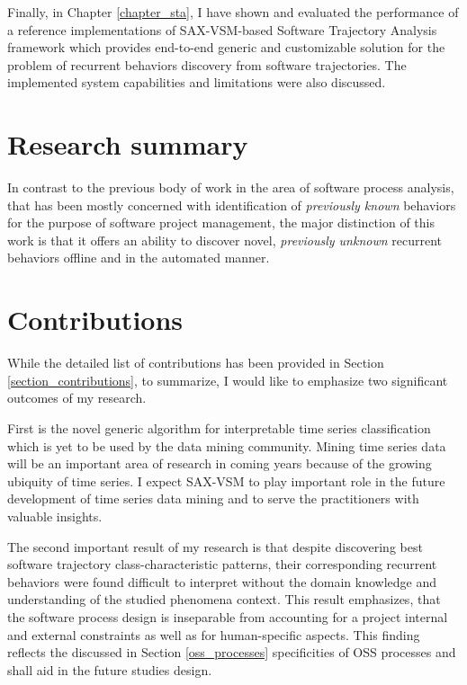 Finally, in Chapter \ref{chapter_sta}, I have shown and evaluated the performance of a reference implementations of SAX-VSM-based Software Trajectory Analysis framework which provides end-to-end generic and customizable solution for the problem of recurrent behaviors discovery from software trajectories. The implemented system capabilities and limitations were also discussed.

\section{Research summary}
In contrast to the previous body of work in the area of software process analysis, that has been mostly concerned with identification of \textit{previously known} behaviors for the purpose of software project management, the major distinction of this work is that it offers an ability to discover novel, \textit{previously unknown} recurrent behaviors offline and in the automated manner.

\section{Contributions}
While the detailed list of contributions has been provided in Section \ref{section_contributions}, to summarize, I would like to emphasize two significant outcomes of my research.

First is the novel generic algorithm for interpretable time series classification which is yet to be used by the data mining community. Mining time series data will be an important area of research in coming years because of the growing ubiquity of time series. I expect SAX-VSM to play important role in the future development of time series data mining and to serve the practitioners with valuable insights.

The second important result of my research is that despite discovering best software trajectory class-characteristic patterns, their corresponding recurrent behaviors were found difficult to interpret without the domain knowledge and understanding of the studied phenomena context. This result emphasizes, that the software process design is inseparable from accounting for a project internal and external constraints as well as for human-specific aspects. This finding reflects the discussed in Section \ref{oss_processes} specificities of OSS processes and shall aid in the future studies design.

